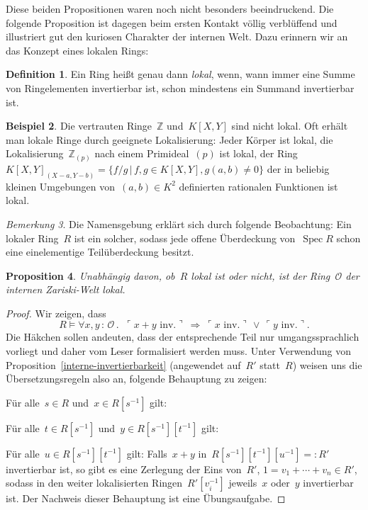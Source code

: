 \documentclass[a4paper,ngerman,12pt]{scrartcl}
\theoremstyle{definition}
\newtheorem{defn}{Definition}[section]
\newtheorem{bsp}[defn]{Beispiel}
\theoremstyle{plain}
\newtheorem{prop}[defn]{Proposition}
\theoremstyle{remark}
\newtheorem{bem}[defn]{Bemerkung}
\newcommand{\ZZ}{\mathbb{Z}}
\renewcommand{\O}{\mathcal{O}}
\DeclareMathOperator{\Spec}{Spec}
\renewcommand{\_}{\mathpunct{.}\,}
\newcommand{\?}{\,{:}\,}
\newcommand{\speak}[1]{\ulcorner\text{#1}\urcorner}
\newenvironment{indentblock}{%
  \list{}{\leftmargin\leftmargin}%
  \item\relax
}{%
  \endlist
}
\begin{document}
Diese beiden Propositionen waren noch nicht besonders beeindruckend.
Die folgende Proposition ist dagegen beim ersten Kontakt völlig verblüffend und
illustriert gut den kuriosen Charakter der internen Welt. Dazu erinnern wir an
das Konzept eines lokalen Rings:
\begin{defn}Ein Ring heißt genau dann \emph{lokal}, wenn, wann immer eine Summe
von Ringelementen invertierbar ist, schon mindestens ein Summand invertierbar
ist.\end{defn}
\begin{bsp}Die vertrauten Ringe~$\ZZ$ und~$K[X,Y]$ sind nicht lokal. Oft erhält
man lokale Ringe durch geeignete Lokalisierung: Jeder Körper ist lokal,
die Lokalisierung~$\ZZ_{(p)}$ nach einem Primideal~$(p)$ ist lokal, der Ring
$K[X,Y]_{(X-a,Y-b)} = \{ f/g \,|\, f,g \in K[X,Y], g(a,b) \neq 0 \}$ der in
beliebig kleinen Umgebungen von~$(a,b) \in K^2$ definierten rationalen
Funktionen ist lokal.
\end{bsp}

\begin{bem}Die Namensgebung erklärt sich durch folgende Beobachtung: Ein
lokaler Ring~$R$ ist ein solcher, sodass jede offene Überdeckung von~$\Spec R$
schon eine einelementige Teilüberdeckung besitzt.\end{bem}

\begin{prop}\label{intern-lokal}%
Unabhängig davon, ob~$R$ lokal ist oder nicht, ist der Ring~$\O$
der internen Zariski-Welt lokal.\end{prop}
\begin{proof}
Wir zeigen, dass
\[ R \models \forall x,y\?\O\_\ \speak{$x+y$ inv.}\ \Longrightarrow\ 
  \speak{$x$ inv.} \,\vee\, \speak{$y$ inv.}. \]
Die Häkchen sollen andeuten, dass der entsprechende Teil nur umgangssprachlich
vorliegt und daher vom Leser formalisiert werden muss. Unter Verwendung von
Proposition~\ref{interne-invertierbarkeit} (angewendet auf~$R'$
statt~$R$) weisen uns die
Übersetzungsregeln also an, folgende Behauptung zu zeigen:
\begin{indentblock}
Für alle~$s \in R$ und~$x \in R[s^{-1}]$ gilt:
\begin{indentblock}
Für alle~$t \in R[s^{-1}]$ und~$y \in R[s^{-1}][t^{-1}]$ gilt:
\begin{indentblock}
Für alle~$u \in R[s^{-1}][t^{-1}]$ gilt: Falls~$x+y$ in~$R[s^{-1}][t^{-1}][u^{-1}] =: R'$
invertierbar ist, so gibt es eine Zerlegung der Eins von~$R'$, $1 = v_1 +
\cdots + v_n \in R'$, sodass in den
weiter lokalisierten Ringen~$R'[v_i^{-1}]$ jeweils~$x$ oder~$y$ invertierbar
ist.
\end{indentblock}
\end{indentblock}
\end{indentblock}
Der Nachweis dieser Behauptung ist eine Übungsaufgabe.
\end{proof}
\end{document}
